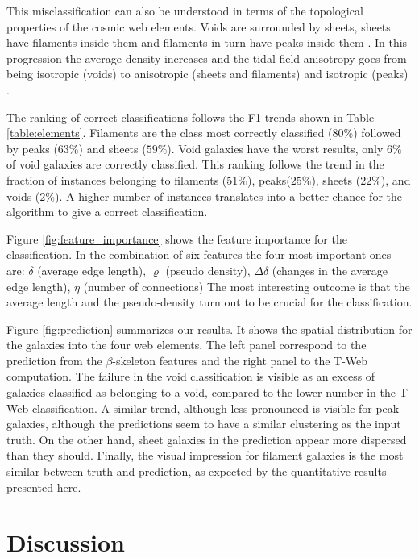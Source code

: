 \documentclass[usenatbib]{mnras}
\begin{document}
This misclassification can also be understood in terms of the
topological properties of the cosmic web elements. 
Voids are surrounded by sheets, sheets have filaments inside them and
filaments in turn have peaks inside them \citep{Cautun2014}. 
In this progression the average density increases and the tidal field
anisotropy goes from being isotropic (voids) to anisotropic (sheets
and filaments) and isotropic (peaks) \citep{Bustamante2015}.

The ranking of correct classifications follows the F1 trends
shown in Table \ref{table:elements}.
Filaments are the class most correctly classified ($80\%$) followed by
peaks ($63\%$) and sheets ($59\%$).
Void galaxies have the worst results, only $6\%$ of void galaxies are
correctly classified.
This ranking follows the trend in the fraction of instances belonging to
filaments ($51\%$), peaks($25\%$), sheets ($22\%$), and voids ($2\%$).
A higher number of instances translates into a better chance for the
algorithm to give a correct classification. 

Figure \ref{fig:feature_importance} shows the feature
importance for the classification.
In the combination of six features the four most important ones are:
$\delta$ (average edge
length), $\varrho$ (pseudo density), $\Delta \delta$ (changes in the average edge length), $\eta$ (number of connections) 
The most interesting outcome is that the average length and the pseudo-density turn out to be crucial for the classification.

Figure \ref{fig:prediction} summarizes our results.
It shows the spatial distribution for the galaxies into the four web
elements. 
The left panel correspond to the prediction from the
$\beta$-skeleton features and the right panel to the T-Web
computation.
The failure in the void classification is visible as an excess of
galaxies classified as belonging to a void, compared to the lower
number in the T-Web classification.
A similar trend, although less pronounced is visible for peak
galaxies, although the predictions seem to have a similar clustering
as the input truth. 
On the other hand, sheet galaxies in the prediction appear more
dispersed than they should.
Finally, the visual impression for filament galaxies is the most
similar between truth and prediction, as expected by the quantitative
results presented here.


\section{Discussion}\label{sec:discussion}
\end{document}
